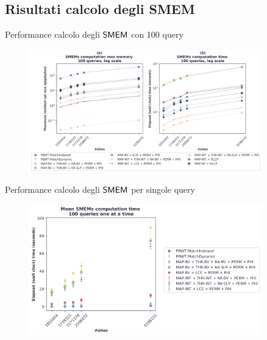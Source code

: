 \documentclass[]{beamer}
\def\SMEM{\mbox{\rm {\sf SMEM}}}
\begin{document}
\subsection{Risultati calcolo degli SMEM}
\begin{frame}{Performance calcolo degli $\SMEM$ con 100 query}
  \begin{figure}[H]
    \centering
    \includegraphics[width=0.9\textwidth]{img/exe_time_mem_paper.png}
  \end{figure}
\end{frame}
\begin{frame}{Performance calcolo degli $\SMEM$ per singole query}
  \begin{figure}[H]
    \centering
    \includegraphics[width=0.9\textwidth]{img/exe_time_single_paper.png}
  \end{figure}
\end{frame}
\end{document}
